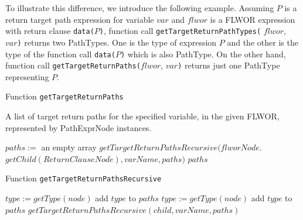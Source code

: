 To illustrate this difference, we introduce the following example. Assuming $P$ is a return target path expression for variable $var$ and $flwor$ is a FLWOR expression with return clause \texttt{data(}$P$\texttt{)}, function call \texttt{getTargetReturnPathTypes(} $flwor$, $var$\texttt{)} returns two PathTypes. One is the type of expression $P$ and the other is the type of the function call \texttt{data(}$P$\texttt{)} which is also PathType. On the other hand, function call \texttt{getTargetReturnPaths(}$flwor$, $var$\texttt{)} returns just one PathType representing $P$. 

\begin{algorithm}
\caption{Function \texttt{getTargetReturnPaths}}
\label{ALG_function_get_target_return_paths}
\begin{algorithmic}[1]
\ENSURE A list of target return paths for the specified variable, in the given FLWOR, represented by PathExprNode instances.

\STATE $paths :=$ an empty array
\STATE $getTargetReturnPathsRecursive(flworNode.$ $getChild(ReturnClauseNode), varName, paths)$
\RETURN $paths$
\end{algorithmic}
\end{algorithm}

\begin{algorithm}
\caption{Function \texttt{getTargetReturnPathsRecursive}}
\label{ALG_function_get_target_return_paths_recursive}
\begin{algorithmic}[1]

	\STATE $type := getType(node)$
		\STATE add $type$ to $paths$
	\ENDIF
{}
		\STATE $type := getType(node)$
			\STATE add $type$ to $paths$
		\ENDIF
	\ENDIF
\ENDIF
{}
	\STATE $getTargetReturnPathsRecursive(child, varName, paths)$
\ENDFOR
\end{algorithmic}
\end{algorithm}

